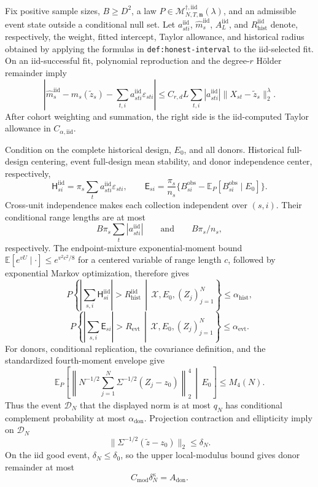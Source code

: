 Fix positive sample sizes, \(B\geq D^2\), a law
\(P\in\mathcal M_{N,T,\mathbf n}^{\dagger,\mathrm{iid}}(\lambda)\), and an admissible event state outside a conditional null set.  Let \(a_{sti}^{\mathrm{iid}}\), \(\widehat m_s^{\mathrm{iid}}\), \(A_L^{\mathrm{iid}}\), and \(R_{\mathrm{hist}}^{\mathrm{iid}}\) denote, respectively, the weight, fitted intercept, Taylor allowance, and historical radius obtained by applying the formulas in \texttt{def:honest-interval} to the iid-selected fit.  On an iid-successful fit, polynomial reproduction and the degree-\(r\) H\"older remainder imply
\[
\left|
\widehat m_s^{\mathrm{iid}}-m_s(\widetilde z_s)
-\sum_{t,i}a_{sti}^{\mathrm{iid}}\varepsilon_{sti}
\right|
\leq C_{r,d}L\sum_{t,i}|a_{sti}^{\mathrm{iid}}|
\|X_{st}-\widetilde z_s\|_2^\lambda.
\tag{106}
\]
After cohort weighting and summation, the right side is the iid-computed Taylor allowance in \(C_{\alpha,\mathrm{iid}}\).

Condition on the complete historical design, \(E_0\), and all donors.  Historical full-design centering, event full-design mean stability, and donor independence center, respectively,
\[
\mathsf H_{si}^{\mathrm{iid}}
=\pi_s\sum_ta_{sti}^{\mathrm{iid}}\varepsilon_{sti},
\qquad
\mathsf E_{si}
=\frac{\pi_s}{n_s}
\{B_{si}^{\mathrm{obs}}-\mathbb E_P[B_{si}^{\mathrm{obs}}\mid E_0]\}.
\]
Cross-unit independence makes each collection independent over \((s,i)\).  Their conditional range lengths are at most
\[
B\pi_s\sum_t|a_{sti}^{\mathrm{iid}}|
\qquad\text{and}\qquad
B\pi_s/n_s,
\]
respectively.  The endpoint-mixture exponential-moment bound
\(\mathbb E[e^{vU}\mid\cdot]\leq e^{v^2c^2/8}\) for a centered variable of range length \(c\), followed by exponential Markov optimization, therefore gives
\[
P\!\left\{
\left|\sum_{s,i}\mathsf H_{si}^{\mathrm{iid}}\right|>R_{\mathrm{hist}}^{\mathrm{iid}}
\,\middle|\,\mathscr X,E_0,(Z_j)_{j=1}^{N}\right\}
\leq\alpha_{\mathrm{hist}},
\tag{107}
\]
\[
P\!\left\{
\left|\sum_{s,i}\mathsf E_{si}\right|>R_{\mathrm{evt}}
\,\middle|\,\mathscr X,E_0,(Z_j)_{j=1}^{N}\right\}
\leq\alpha_{\mathrm{evt}}.
\tag{108}
\]
For donors, conditional replication, the covariance definition, and the standardized fourth-moment envelope give
\[
\mathbb E_P\!\left[
\left\|N^{-1/2}\sum_{j=1}^{N}\Sigma^{-1/2}(Z_j-z_0)\right\|_2^4
\,\middle|\,E_0\right]
\leq M_4(N).
\tag{109}
\]
Thus the event \(\mathcal D_N\) that the displayed norm is at most \(q_N\) has conditional complement probability at most \(\alpha_{\mathrm{don}}\).  Projection contraction and ellipticity imply on \(\mathcal D_N\)
\[
\|\Sigma^{-1/2}(\widetilde z-z_0)\|_2\leq\delta_N.
\tag{110}
\]
On the iid good event, \(\delta_N\leq\delta_0\), so the upper local-modulus bound gives donor remainder at most
\[
C_{\mathrm{mod}}\delta_N^\kappa=A_{\mathrm{don}}.
\tag{111}
\]

